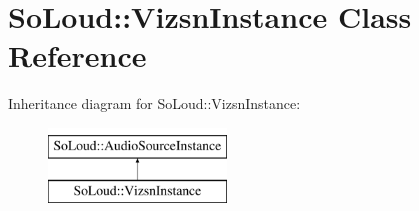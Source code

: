 \hypertarget{class_so_loud_1_1_vizsn_instance}{}\section{So\+Loud\+::Vizsn\+Instance Class Reference}
\label{class_so_loud_1_1_vizsn_instance}
Inheritance diagram for So\+Loud\+::Vizsn\+Instance\+:\begin{figure}[H]
\begin{center}
\leavevmode
\includegraphics[height=2.000000cm]{class_so_loud_1_1_vizsn_instance}
\end{center}
\end{figure}
